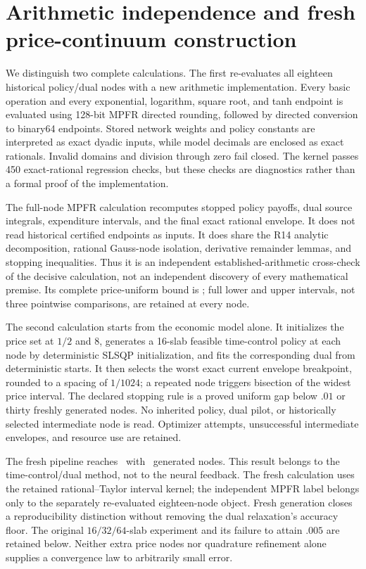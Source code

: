 \section{Arithmetic independence and fresh price-continuum construction}\label{sec:r16price}
We distinguish two complete calculations. The first re-evaluates all eighteen historical policy/dual nodes with a new arithmetic implementation. Every basic operation and every exponential, logarithm, square root, and tanh endpoint is evaluated using 128-bit MPFR directed rounding, followed by directed conversion to binary64 endpoints. Stored network weights and policy constants are interpreted as exact dyadic inputs, while model decimals are enclosed as exact rationals. Invalid domains and division through zero fail closed. The kernel passes 450 exact-rational regression checks, but these checks are diagnostics rather than a formal proof of the implementation.

The full-node MPFR calculation recomputes stopped policy payoffs, dual source integrals, expenditure intervals, and the final exact rational envelope. It does not read historical certified endpoints as inputs. It does share the R14 analytic decomposition, rational Gauss-node isolation, derivative remainder lemmas, and stopping inequalities. Thus it is an independent established-arithmetic cross-check of the decisive calculation, not an independent discovery of every mathematical premise. Its complete price-uniform bound is \RMPFRGap; full lower and upper intervals, not three pointwise comparisons, are retained at every node.

The second calculation starts from the economic model alone. It initializes the price set at $1/2$ and $8$, generates a 16-slab feasible time-control policy at each node by deterministic SLSQP initialization, and fits the corresponding dual from deterministic starts. It then selects the worst exact current envelope breakpoint, rounded to a spacing of $1/1024$; a repeated node triggers bisection of the widest price interval. The declared stopping rule is a proved uniform gap below $.01$ or thirty freshly generated nodes. No inherited policy, dual pilot, or historically selected intermediate node is read. Optimizer attempts, unsuccessful intermediate envelopes, and resource use are retained.


The fresh pipeline reaches \RFreshGap\ with \RFreshNodes\ generated nodes. This result belongs to the time-control/dual method, not to the neural feedback. The fresh calculation uses the retained rational--Taylor interval kernel; the independent MPFR label belongs only to the separately re-evaluated eighteen-node object. Fresh generation closes a reproducibility distinction without removing the dual relaxation's accuracy floor. The original $16/32/64$-slab experiment and its failure to attain $.005$ are retained below. Neither extra price nodes nor quadrature refinement alone supplies a convergence law to arbitrarily small error.

